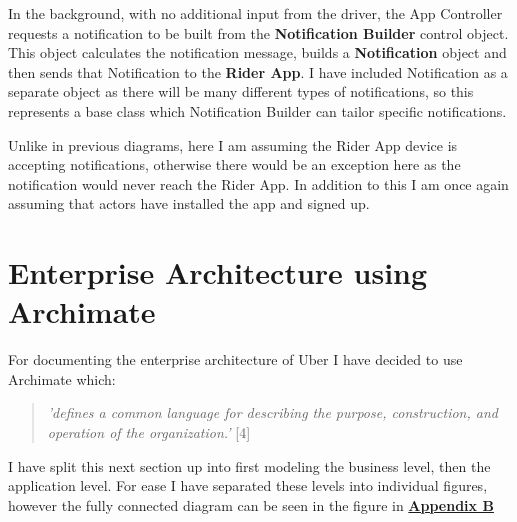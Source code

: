 \documentclass{article}
\begin{document}
    In the background, with no additional input from the driver, the App Controller requests a notification to be built from the \textbf{Notification Builder} control object.
    This object calculates the notification message, builds a \textbf{Notification} object and then sends that Notification to the \textbf{Rider App}.
    I have included Notification as a separate object as there will be many different types of notifications, so this represents a base class which Notification Builder
    can tailor specific notifications.

    Unlike in previous diagrams, here I am assuming the Rider App device is accepting notifications, otherwise there would be an exception here as the 
    notification would never reach the Rider App. In addition to this I am once again assuming that actors have installed the app and signed up.

    \newpage
    \section{Enterprise Architecture using Archimate}
    For documenting the enterprise architecture of Uber I have decided to use Archimate which:
    \begin{quote}
      \textit{'defines a common language for describing the purpose, construction, and operation of the organization.'} [4]
    \end{quote}
    I have split this next section up into first modeling the business level, then the application level. For ease I have separated these levels into
    individual figures, however the fully connected diagram can be seen in the figure in \hyperref[sec:AppendixB]{\textbf{Appendix B}}
\end{document}
